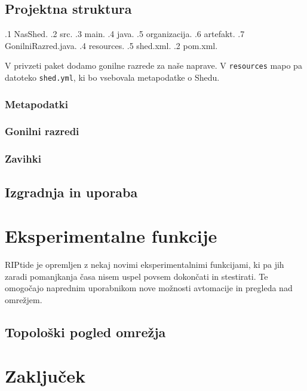 \documentclass[12pt]{article}
\begin{document}
\subsection{Projektna struktura} \label{projektna-struktura}
\begin{dirtree}{%
.1 NasShed.
	.2 src.
		.3 main.
			.4 java.
				.5 organizacija.
					.6 artefakt.
						.7 GonilniRazred.java.
			.4 resources.
				.5 shed.xml.
	.2 pom.xml.
}
\end{dirtree}
\vspace*{12pt}
V privzeti paket dodamo gonilne razrede za naše naprave. V
\texttt{resources} mapo pa datoteko \texttt{shed.yml}, ki bo vsebovala
metapodatke o Shedu.

\subsubsection{Metapodatki}

\subsubsection{Gonilni razredi}
\subsubsection{Zavihki}
\subsection{Izgradnja in uporaba}
\newpage

\section{Eksperimentalne funkcije}
RIPtide je opremljen z nekaj novimi eksperimentalnimi funkcijami,
ki pa jih zaradi pomanjkanja časa nisem uspel povsem dokončati in
stestirati. Te omogočajo naprednim uporabnikom nove možnosti avtomacije
in pregleda nad omrežjem.

\subsection{Topološki pogled omrežja}
\newpage

\section{Zaključek}
\newpage
\end{document}
